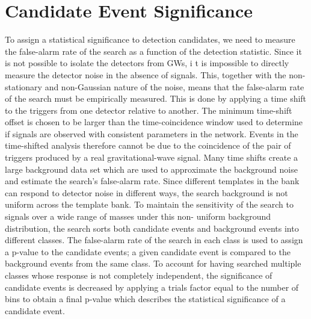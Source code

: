 \documentclass[binding=0.6cm, LaM]{sapthesis}
\begin{document}
\section{Candidate Event Significance}


	To assign a statistical significance to detection candidates, 
	we need to measure the false-alarm rate of the search as a function of the detection statistic.
	Since it is not possible to isolate the detectors from GWs, i
	t is impossible to directly measure the detector noise in the absence of signals. 
	This, together with the non-stationary and non-Gaussian nature of the noise, 
	means that the false-alarm rate of the search must be empirically measured. 
	This is done by applying a time shift to the triggers from one detector relative to another. 
	The minimum time-shift offset is chosen to be larger than the time-coincidence window 
	used to determine if signals are observed with consistent parameters in the network. 
	Events in the time-shifted analysis therefore cannot be due to the coincidence 
	of the pair of triggers produced by a real gravitational-wave signal. 
	Many time shifts create a large background data set which are used to 
	approximate the background noise and estimate the search’s false-alarm rate. 
	Since different templates in the bank can respond to detector noise in different ways, 
	the search background is not uniform across the template bank. 
	To maintain the sensitivity of the search to signals over a wide range 
	of masses under this non- uniform background distribution, 
	the search sorts both candidate events and background events into different classes. 
	The false-alarm rate of the search in each class is used to 
	assign a p-value to the candidate events; 
	a given candidate event is compared to the background events from the same class. 
	To account for having searched multiple classes 
	whose response is not completely independent, 
	the significance of candidate events is decreased by applying 
	a trials factor equal to the number of bins to obtain a final p-value 
	which describes the statistical significance of a candidate event. 
\end{document}
